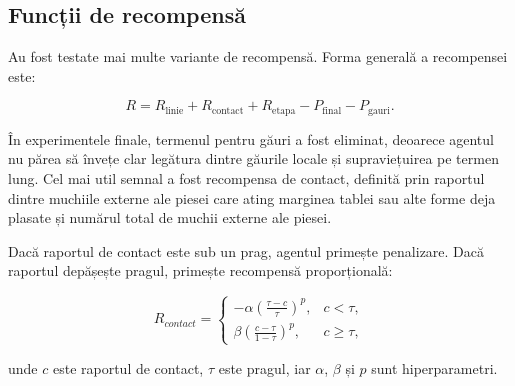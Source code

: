 \documentclass[12pt,a4paper]{article}
\begin{document}
\subsection{Funcții de recompensă}

Au fost testate mai multe variante de recompensă. Forma generală a recompensei este:

\begin{equation}
    R = R_{\text{linie}} + R_{\text{contact}} + R_{\text{etapa}} - P_{\text{final}} - P_{\text{gauri}}.
\end{equation}

În experimentele finale, termenul pentru găuri a fost eliminat, deoarece agentul nu părea să învețe clar legătura dintre găurile locale și supraviețuirea pe termen lung. Cel mai util semnal a fost recompensa de contact, definită prin raportul dintre muchiile externe ale piesei care ating marginea tablei sau alte forme deja plasate și numărul total de muchii externe ale piesei.

Dacă raportul de contact este sub un prag, agentul primește penalizare. Dacă raportul depășește pragul, primește recompensă proporțională:

\begin{equation}
    R_{contact} =
    \begin{cases}
        -\alpha \left(\frac{\tau - c}{\tau}\right)^p, & c < \tau, \\
        \beta \left(\frac{c - \tau}{1 - \tau}\right)^p, & c \geq \tau,
    \end{cases}
\end{equation}


unde $c$ este raportul de contact, $\tau$ este pragul, iar $\alpha$, $\beta$ și $p$ sunt hiperparametri.
\end{document}

